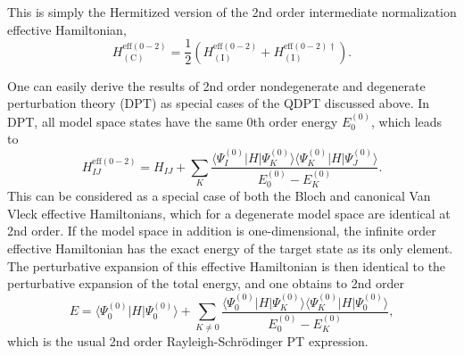 This is simply the Hermitized version of the 2nd order intermediate normalization effective Hamiltonian,
	\begin{equation}
	\label{Eq:Hermitized}
	H_{({\text{C}})}^{{\text{eff}}(0 - 2)} = \frac{1}{2}(H_{({\text{I}})}^{{\text{eff}}(0 - 2)} + H{_{({\text{I}})}^{{\text{eff}}(0 - 2)\dagger} }).
	\end{equation} 	
	
One can easily derive the results of 2nd order nondegenerate\cite{Schroe_1926_437} and degenerate perturbation theory (DPT)\cite{Klein_1974_786} as special cases of the QDPT discussed above. In DPT, all model space states have the same 0th order energy $E_0^{(0)}$, which leads to
\begin{equation}
	\label{Eq:HeffDPT}
	H_{IJ}^{{\text{eff}}(0 - 2)} = {H_{IJ}} + \sum\limits_K {\frac{{\langle \Psi _I^{(0)}|H|\Psi _K^{(0)}\rangle \langle \Psi _K^{(0)}|H|\Psi _J^{(0)}\rangle }}{{E_0^{(0)} - E_K^{(0)}}}}. 
	\end{equation}
This can be considered as a special case of both the Bloch and canonical Van Vleck effective Hamiltonians, which for a degenerate model space are identical at 2nd order.
If the model space in addition is one-dimensional, the infinite order effective Hamiltonian has the exact energy of the target state as its only element. The perturbative expansion of this effective Hamiltonian is then identical to the perturbative expansion of the total energy, and one obtains to 2nd order
\begin{equation}
E = \langle \Psi_0^{(0)}|H|\Psi_0^{(0)}\rangle + \sum_{K\neq 0} \frac{\langle\Psi_0^{(0)}|H|\Psi_K^{(0)}\rangle\langle \Psi_K^{(0)}|H|\Psi_0^{(0)}\rangle}{E_0^{(0)}-E_K^{(0)}},
\end{equation}
which is the usual 2nd order Rayleigh-Schrödinger PT expression.\cite{Schroe_1926_437}
	
